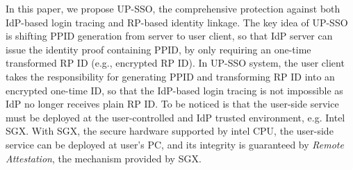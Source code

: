 In this paper, we propose UP-SSO, 
the comprehensive protection against both IdP-based login tracing and RP-based identity linkage.
The key idea of UP-SSO is shifting PPID generation from server to user client,
so that IdP server can issue the identity proof containing PPID, by only requiring an one-time transformed RP ID (e.g., encrypted RP ID). 
In UP-SSO system, the user client takes the responsibility for generating PPID and transforming RP ID into an encrypted one-time ID,
so that the IdP-based login tracing is not impossible as IdP no longer receives plain RP ID.
To be noticed is that the user-side service must be deployed at the user-controlled and IdP trusted environment, e.g. Intel SGX. 
With SGX, the secure hardware supported by intel CPU, the user-side service can be deployed at user's PC, and its integrity is guaranteed by \emph{Remote Attestation}, the mechanism provided by SGX.



